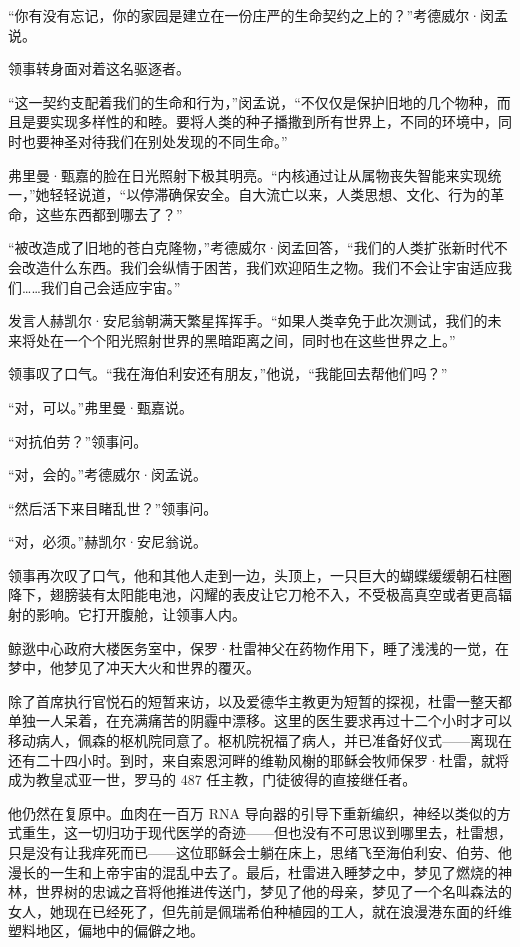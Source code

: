 \documentclass[AutoFakeBold=true]{book}
\begin{document}
``你有没有忘记，你的家园是建立在一份庄严的生命契约之上的？''考德威尔·闵孟说。

领事转身面对着这名驱逐者。

``这一契约支配着我们的生命和行为，''闵孟说，``不仅仅是保护旧地的几个物种，而且是要实现多样性的和睦。要将人类的种子播撒到所有世界上，不同的环境中，同时也要神圣对待我们在别处发现的不同生命。''

弗里曼·甄嘉的脸在日光照射下极其明亮。``内核通过让从属物丧失智能来实现统一，''她轻轻说道，``以停滞确保安全。自大流亡以来，人类思想、文化、行为的革命，这些东西都到哪去了？''

``被改造成了旧地的苍白克隆物，''考德威尔·闵孟回答，``我们的人类扩张新时代不会改造什么东西。我们会纵情于困苦，我们欢迎陌生之物。我们不会让宇宙适应我们……我们自己会适应宇宙。''

发言人赫凯尔·安尼翁朝满天繁星挥挥手。``如果人类幸免于此次测试，我们的未来将处在一个个阳光照射世界的黑暗距离之间，同时也在这些世界之上。''

领事叹了口气。``我在海伯利安还有朋友，''他说，``我能回去帮他们吗？''

``对，可以。''弗里曼·甄嘉说。

``对抗伯劳？''领事问。

``对，会的。''考德威尔·闵孟说。

``然后活下来目睹乱世？''领事问。

``对，必须。''赫凯尔·安尼翁说。

领事再次叹了口气，他和其他人走到一边，头顶上，一只巨大的蝴蝶缓缓朝石柱圈降下，翅膀装有太阳能电池，闪耀的表皮让它刀枪不入，不受极高真空或者更高辐射的影响。它打开腹舱，让领事人内。

\vspace*{1em}

鲸逖中心政府大楼医务室中，保罗·杜雷神父在药物作用下，睡了浅浅的一觉，在梦中，他梦见了冲天大火和世界的覆灭。

除了首席执行官悦石的短暂来访，以及爱德华主教更为短暂的探视，杜雷一整天都单独一人呆着，在充满痛苦的阴霾中漂移。这里的医生要求再过十二个小时才可以移动病人，佩森的枢机院同意了。枢机院祝福了病人，并已准备好仪式——离现在还有二十四小时。到时，来自索恩河畔的维勒风榭的耶稣会牧师保罗·杜雷，就将成为教皇忒亚一世，罗马的 487 任主教，门徒彼得的直接继任者。

他仍然在复原中。血肉在一百万 RNA 导向器的引导下重新编织，神经以类似的方式重生，这一切归功于现代医学的奇迹——但也没有不可思议到哪里去，杜雷想，只是没有让我痒死而已——这位耶稣会士躺在床上，思绪飞至海伯利安、伯劳、他漫长的一生和上帝宇宙的混乱中去了。最后，杜雷进入睡梦之中，梦见了燃烧的神林，世界树的忠诚之音将他推进传送门，梦见了他的母亲，梦见了一个名叫森法的女人，她现在已经死了，但先前是佩瑞希伯种植园的工人，就在浪漫港东面的纤维塑料地区，偏地中的偏僻之地。
\end{document}
